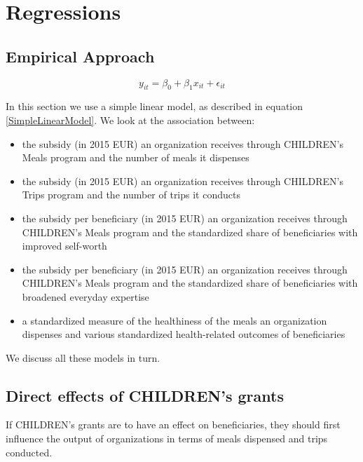 \documentclass[12pt, a4paper, titlepage]{article}\usepackage[]{graphicx}\usepackage[]{color}
\begin{document}
\section{Regressions}

\subsection{Empirical Approach} 

\begin{equation}
\label{SimpleLinearModel}
  y_{it} = \beta_0 + \beta_1 x_{it} + \epsilon_{it}
\end{equation}

In this section we use a simple linear model, as described in equation \ref{SimpleLinearModel}. We look at the association between: 

\begin{itemize}
  \item{the subsidy (in 2015 EUR) an organization receives through CHILDREN's Meals program and the number of meals it dispenses}
  \item{the subsidy (in 2015 EUR) an organization receives through CHILDREN's Trips program and the number of trips it conducts}
  \item{the subsidy per beneficiary (in 2015 EUR) an organization receives through CHILDREN's Meals program and the standardized share of beneficiaries with improved self-worth}
  \item{the subsidy per beneficiary (in 2015 EUR) an organization receives through CHILDREN's Meals program and the standardized share of beneficiaries with broadened everyday expertise}
   \item{a standardized measure of the healthiness of the meals an organization dispenses and various standardized health-related outcomes of beneficiaries} 
\end{itemize}

We discuss all these models in turn.

\subsection{Direct effects of CHILDREN's grants} 

If CHILDREN's grants are to have an effect on beneficiaries, they should first influence the output of organizations in terms of meals dispensed and trips conducted. 

  
\end{document}
